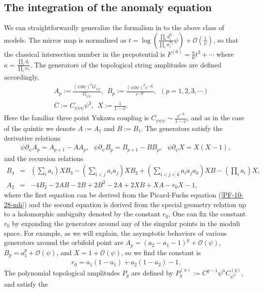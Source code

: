 \documentclass[12pt]{article}
\begin{document}
\subsection{The integration of the anomaly equation}
We can straightforwardly generalize the formalism in
\cite{Yamaguchi} to the above class of models.  The mirror map is
normalized as $t= \log(\frac{\prod_i d_i^{d_i}}{\prod_i
w_i^{w_i}}\psi)+\mathcal{O}(\frac{1}{\psi})$, so that the
classical intersection number in the prepotential is $F^{(0)}=
\frac{\kappa}{6}t^3+\cdots$ where $\kappa=\frac{\prod_i
d_i}{\prod_i w_i}$. The generators of the topological string
amplitudes are defined accordingly,
\begin{eqnarray}
&&A_p:=\frac{(\psi\partial\psi)^p
G_{\psi\bar{\psi}}}{G_{\psi\bar{\psi}}},~~B_p:=\frac{(\psi\partial\psi)^p
e^{-K}}{e^{-K}}, ~~(p=1,2,3,\cdots) \nonumber \\ &&
C:=C_{\psi\psi\psi}\psi^3,~~X:=\frac{1}{1-\psi}.
\end{eqnarray}
Here the familiar three point Yukawa coupling is
$C_{\psi\psi\psi}\sim \frac{\psi^{-2}}{1-\psi}$, and as in the
case of the quintic we denote $A:=A_1$ and $B:=B_1$. The generators
satisfy the derivative relations
\begin{eqnarray}
\psi\partial_\psi A_p=A_{p+1}-AA_p, ~~~ \psi\partial_\psi
B_p=B_{p+1}-BB_p,~~~ \psi\partial_\psi X=X(X-1), \nonumber
\end{eqnarray}
and the recursion relations
\begin{eqnarray}
B_4 &=&
(\sum_ia_i)XB_3-(\sum_{i<j}a_ia_j)XB_2+(\sum_{i<j<k}a_ia_ja_k)XB-(\prod_i
a_i)X, \nonumber \\
A_2 &=& -4B_2-2AB-2B+2B^2-2A+2XB+XA-r_0X-1,
\end{eqnarray}
where the first equation can be derived from the Picard-Fuchs
equation (\ref{PF-10-28-mh}) and the second equation is derived
from the special geometry relation up to a holomorphic ambiguity
denoted by the constant $r_0$. One can fix the constant $r_0$ by
expanding the generators around any of the singular points in the
moduli space. For example, as we will explain, the asymptotic
behaviors of various generators around the orbifold point are
$A_p=(a_2-a_1-1)^p+\mathcal{O}(\psi)$,
$B_p=a_1^p+\mathcal{O}(\psi)$, and $X=1+\mathcal{O}(\psi)$, so we
find the constant is
\begin{eqnarray} \label{constantr0-10-28}
r_0=a_1(1-a_1)+a_2(1-a_2)-1.
\end{eqnarray}
The polynomial topological amplitudes $P_g$ are defined by
$P^{(n)}_g:=C^{g-1}\psi^nC^{(g)}_{\psi^n}$, and satisfy the
\end{document}
